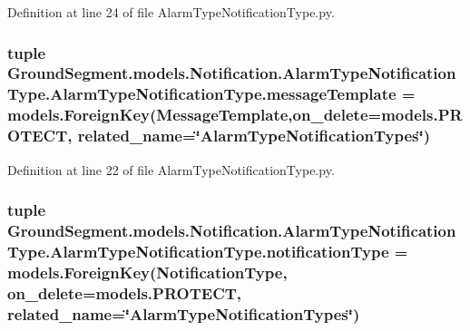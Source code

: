Definition at line 24 of file Alarm\+Type\+Notification\+Type.\+py.

\hypertarget{class_ground_segment_1_1models_1_1_notification_1_1_alarm_type_notification_type_1_1_alarm_type_notification_type_ab3c9522d5f6e0d6f4cb640240f98e384}{}
\subsubsection[{message\+Template}]{\setlength{\rightskip}{0pt plus 5cm}tuple Ground\+Segment.\+models.\+Notification.\+Alarm\+Type\+Notification\+Type.\+Alarm\+Type\+Notification\+Type.\+message\+Template = models.\+Foreign\+Key({\bf Message\+Template},on\+\_\+delete=models.\+P\+R\+O\+T\+E\+C\+T, related\+\_\+name=\char`\"{}Alarm\+Type\+Notification\+Types\char`\"{})\hspace{0.3cm}{\ttfamily [static]}}\label{class_ground_segment_1_1models_1_1_notification_1_1_alarm_type_notification_type_1_1_alarm_type_notification_type_ab3c9522d5f6e0d6f4cb640240f98e384}


Definition at line 22 of file Alarm\+Type\+Notification\+Type.\+py.

\hypertarget{class_ground_segment_1_1models_1_1_notification_1_1_alarm_type_notification_type_1_1_alarm_type_notification_type_adcaf2d8b90b3972c1288fd6e05affe82}{}
\subsubsection[{notification\+Type}]{\setlength{\rightskip}{0pt plus 5cm}tuple Ground\+Segment.\+models.\+Notification.\+Alarm\+Type\+Notification\+Type.\+Alarm\+Type\+Notification\+Type.\+notification\+Type = models.\+Foreign\+Key({\bf Notification\+Type}, on\+\_\+delete=models.\+P\+R\+O\+T\+E\+C\+T, related\+\_\+name=\char`\"{}Alarm\+Type\+Notification\+Types\char`\"{})\hspace{0.3cm}{\ttfamily [static]}}\label{class_ground_segment_1_1models_1_1_notification_1_1_alarm_type_notification_type_1_1_alarm_type_notification_type_adcaf2d8b90b3972c1288fd6e05affe82}


